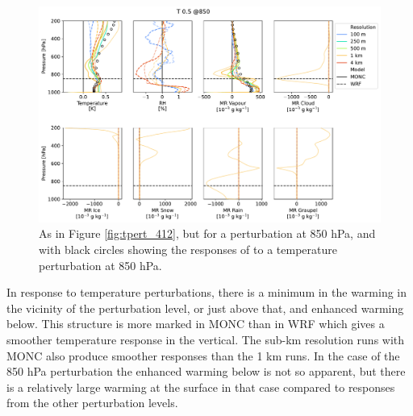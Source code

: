 \documentclass[draft]{agujournal2019}
\begin{document}
\begin{figure}[pth]
    \noindent\includegraphics[width=\textwidth]{figures/pert_diffs_T_0.5_@850}
    \caption{As in Figure \ref{fig:tpert_412}, but for a perturbation at 850
    hPa, and with black circles showing the responses of 
    to a temperature perturbation at 850 hPa.}
    \label{fig:tpert_850}
\end{figure}

In response to temperature perturbations, there is a minimum in the warming in
the vicinity of the perturbation level, or just above that, and enhanced warming
below. This structure is more marked in MONC than in WRF which gives a smoother
temperature response in the vertical. The sub-km resolution runs with MONC also
produce smoother responses than the 1 km runs. In the case of the 850 hPa
perturbation the enhanced warming below is not so apparent, but there is a
relatively large warming at the surface in that case compared to responses from
the other perturbation levels.
\end{document}
